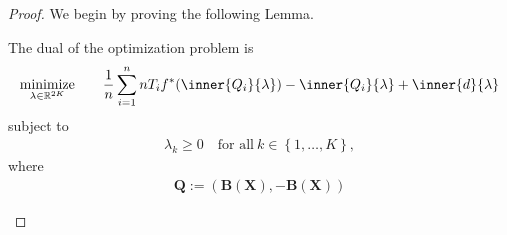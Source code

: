 \begin{proof}
  We begin by proving the following Lemma.
  \begin{lemma}
    The dual of the optimization problem is
  \begin{gather*}
    \underset{\lambda \in \R^{2K}}{\mathrm{minimize}}
    \qquad
    \frac{1}{n}
    \sum_{i = 1}^{n} 
    nT_i 
    f^*
    (
      \inner{Q_i}{\lambda}
    )
    -
    \inner{Q_i}{\lambda}
    +
    \inner{d}{\lambda}
  \end{gather*}
  subject to
  \begin{gather}
    \lambda_k \ge 0
    \quad
    \text{for all}\ 
    k \in \left\{ 1, \ldots, K \right\}
    ,
  \end{gather}
  where
  \begin{gather}
    \mathbf{Q}
    :=
    \left( 
      \mathbf{B}(\mathbf{X})
      ,
      -\mathbf{B}(\mathbf{X})
    \right)
  \end{gather}

  \end{lemma}
\end{proof}
